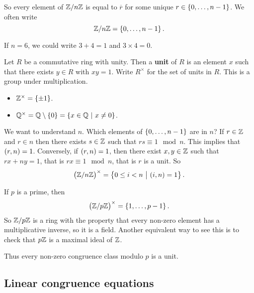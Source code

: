 So every element of $ \mathbb{Z} / n\mathbb{Z} $ is equal to $ \overline{r} $ for some unique $ r \in \cbr{0, \dots, n - 1} $. We often write
$$ \ZZ / n\ZZ = \cbr{0, \dots, n - 1}. $$

\begin{example*}
If $ n = 6 $, we could write $ 3 + 4 = 1 $ and $ 3 \times 4 = 0 $.
\end{example*}

Let $ R $ be a commutative ring with unity. Then a \textbf{unit} of $ R $ is an element $ x $ such that there exists $ y \in R $ with $ xy = 1 $. Write $ R^\times $ for the set of units in $ R $. This is a group under multiplication.

\begin{example*}
\hfill
\begin{itemize}
\item $ \ZZ^\times = \cbr{\pm 1} $.
\item $ \QQ^\times = \QQ \setminus \cbr{0} = \cbr{x \in \QQ \st x \ne 0} $.
\end{itemize}
\end{example*}

We want to understand $ \unit{n} $. Which elements of $ \cbr{0, \dots, n - 1} $ are in $ \unit{n} $? If $ r \in \mathbb{Z} $ and $ r \in \unit{n} $ then there exists $ s \in \mathbb{Z} $ such that $ rs \equiv 1 \mod n $. This implies that $ \br{r, n} = 1 $. Conversely, if $ \br{r, n} = 1 $, then there exist $ x, y \in \mathbb{Z} $ such that $ rx + ny = 1 $, that is $ rx \equiv 1 \mod n $, that is $ r $ is a unit. So
$$ \unit{n} = \cbr{0 \le i < n \st \br{i, n} = 1}. $$

\begin{example*}
If $ p $ is a prime, then
$$ \unit{p} = \cbr{1, \dots, p - 1}. $$
So $ \mathbb{Z} / p\mathbb{Z} $ is a ring with the property that every non-zero element has a multiplicative inverse, so it is a field. Another equivalent way to see this is to check that $ p\mathbb{Z} $ is a maximal ideal of $ \mathbb{Z} $.
\end{example*}

Thus every non-zero congruence class modulo $ p $ is a unit.

\subsection{Linear congruence equations}


